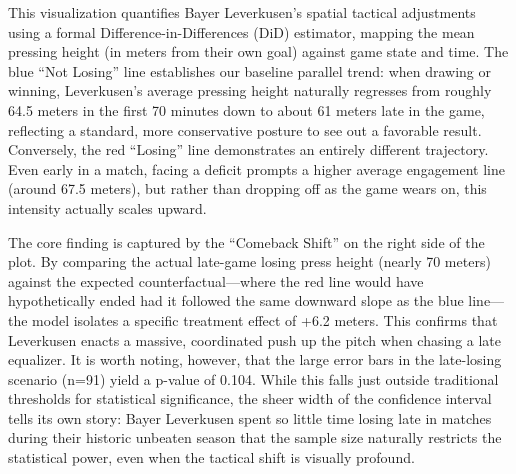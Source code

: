 \documentclass[
]{article}
\begin{document}
This visualization quantifies Bayer Leverkusen's spatial tactical
adjustments using a formal Difference-in-Differences (DiD) estimator,
mapping the mean pressing height (in meters from their own goal) against
game state and time. The blue ``Not Losing'' line establishes our
baseline parallel trend: when drawing or winning, Leverkusen's average
pressing height naturally regresses from roughly 64.5 meters in the
first 70 minutes down to about 61 meters late in the game, reflecting a
standard, more conservative posture to see out a favorable result.
Conversely, the red ``Losing'' line demonstrates an entirely different
trajectory. Even early in a match, facing a deficit prompts a higher
average engagement line (around 67.5 meters), but rather than dropping
off as the game wears on, this intensity actually scales upward.

The core finding is captured by the ``Comeback Shift'' on the right side
of the plot. By comparing the actual late-game losing press height
(nearly 70 meters) against the expected counterfactual---where the red
line would have hypothetically ended had it followed the same downward
slope as the blue line---the model isolates a specific treatment effect
of +6.2 meters. This confirms that Leverkusen enacts a massive,
coordinated push up the pitch when chasing a late equalizer. It is worth
noting, however, that the large error bars in the late-losing scenario
(n=91) yield a p-value of 0.104. While this falls just outside
traditional thresholds for statistical significance, the sheer width of
the confidence interval tells its own story: Bayer Leverkusen spent so
little time losing late in matches during their historic unbeaten season
that the sample size naturally restricts the statistical power, even
when the tactical shift is visually profound.
\end{document}
